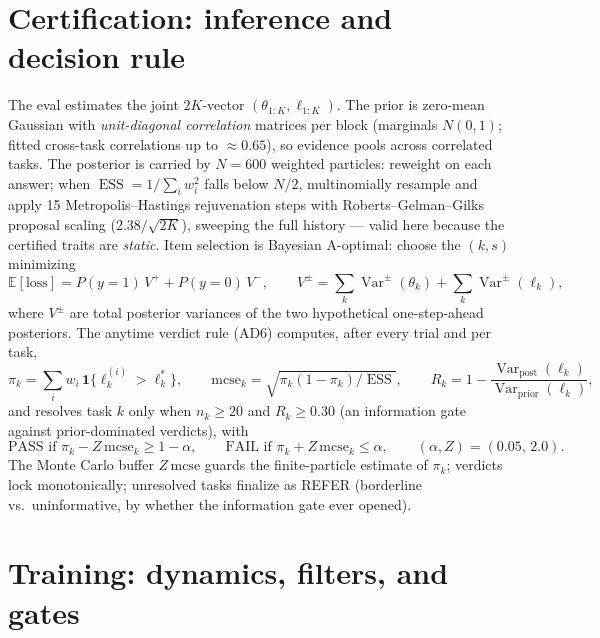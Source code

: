 \documentclass[11pt]{article}
\newcommand{\ellstar}{\ell^{*}}
\DeclareMathOperator{\ESS}{ESS}
\DeclareMathOperator{\Var}{Var}
\begin{document}
\section{Certification: inference and decision rule}
The eval estimates the joint $2K$-vector $(\theta_{1:K}, \ell_{1:K})$. The prior
is zero-mean Gaussian with \emph{unit-diagonal correlation} matrices per block
(marginals $N(0,1)$; fitted cross-task correlations up to ${\approx}0.65$), so
evidence pools across correlated tasks. The posterior is carried by $N=600$
weighted particles: reweight on each answer; when
$\ESS = 1/\sum_i w_i^2$ falls below $N/2$, multinomially resample and apply
15 Metropolis--Hastings rejuvenation steps with Roberts--Gelman--Gilks proposal
scaling ($2.38/\sqrt{2K}$), sweeping the full history --- valid here because the
certified traits are \emph{static}. Item selection is Bayesian A-optimal: choose
the $(k, s)$ minimizing
\begin{equation}
\mathbb{E}[\text{loss}] = P(y{=}1)\, V^{+} + P(y{=}0)\, V^{-},
\qquad V^{\pm} = \textstyle\sum_k \Var^{\pm}(\theta_k) + \sum_k \Var^{\pm}(\ell_k),
\end{equation}
where $V^{\pm}$ are total posterior variances of the two hypothetical
one-step-ahead posteriors. The anytime verdict rule (AD6) computes, after every
trial and per task,
\begin{equation}
\pi_k = \sum_i w_i\, \mathbf{1}\{\ell_k^{(i)} > \ellstar_k\}, \qquad
\mathrm{mcse}_k = \sqrt{\pi_k(1-\pi_k)/\ESS}, \qquad
R_k = 1 - \frac{\Var_{\mathrm{post}}(\ell_k)}{\Var_{\mathrm{prior}}(\ell_k)},
\end{equation}
and resolves task $k$ only when $n_k \ge 20$ and $R_k \ge 0.30$ (an information
gate against prior-dominated verdicts), with
\begin{equation}
\text{PASS if } \pi_k - Z\,\mathrm{mcse}_k \ge 1-\alpha, \qquad
\text{FAIL if } \pi_k + Z\,\mathrm{mcse}_k \le \alpha, \qquad
(\alpha, Z) = (0.05,\, 2.0).
\end{equation}
The Monte Carlo buffer $Z\,\mathrm{mcse}$ guards the finite-particle estimate of
$\pi_k$; verdicts lock monotonically; unresolved tasks finalize as REFER
(borderline vs.\ uninformative, by whether the information gate ever opened).

\section{Training: dynamics, filters, and gates}
\end{document}
